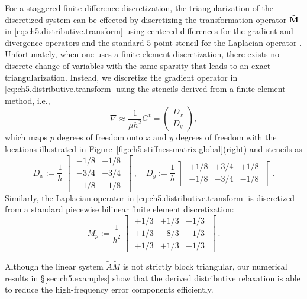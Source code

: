 For a staggered finite difference discretization, the triangularization of the discretized system can be effected by discretizing the transformation operator $\tilde{\mathbf{M}}$ in \eqref{eq:ch5.distributive.transform} using centered
differences for the gradient and divergence operators and the standard $5$-point stencil for the Laplacian operator \cite{Zhu.Yongning10}. Unfortunately, when one uses a finite element discretization, there exists no discrete change of variables with the same sparsity that leads to an exact triangularization. Instead, we discretize the gradient operator in
\eqref{eq:ch5.distributive.transform} using the stencils derived from a finite element method, i.e.,
\begin{equation*}
\nabla \approx \frac{1}{\mu h^2} G^t = \begin{pmatrix} D_x \\ D_y \end{pmatrix},
\end{equation*}
which maps $p$ degrees of freedom onto $x$ and $y$ degrees of freedom with the locations illustrated in Figure~\ref{fig:ch5.stiffnessmatrix.global}(right) and stencils as
\begin{equation*}
D_x := \frac{1}{h}
\left] \begin{matrix} -1/8 & +1/8 \\ -3/4 & +3/4 \\ -1/8 & +1/8 \end{matrix} \right[, \quad
D_y := \frac{1}{h}
\left] \begin{matrix} +1/8 & +3/4 & +1/8 \\ -1/8 & -3/4 & -1/8 \end{matrix} \right[.
\end{equation*}
Similarly, the Laplacian operator in \eqref{eq:ch5.distributive.transform} is discretized from a standard piecewise bilinear finite element discretization:
\begin{equation*}
M_p := \frac{1}{h^2} \left] \begin{matrix} +1/3 & +1/3 & +1/3 \\ +1/3 & -8/3 & +1/3 \\ +1/3 & +1/3 & +1/3 \end{matrix} \right[.
\end{equation*}

Although the linear system $\tilde{A} \tilde{M}$ is not strictly block triangular, our numerical results in \S\ref{sec:ch5.examples} show that the derived distributive relaxation is able to reduce the high-frequency error components efficiently.

